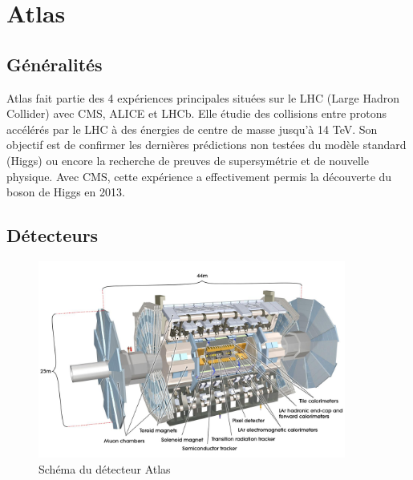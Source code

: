 \documentclass[11pt]{article} %
\begin{document}
%




\section{Atlas}

\subsection{Généralités}

Atlas fait partie des 4 expériences principales situées sur le LHC (Large Hadron Collider) avec CMS, ALICE et LHCb.
Elle étudie des collisions entre protons accélérés par le LHC à des énergies de centre de masse jusqu'à 14 TeV. Son objectif est de confirmer les dernières prédictions non testées du modèle standard (Higgs) ou encore la recherche de preuves de supersymétrie et de nouvelle physique. Avec CMS, cette expérience a effectivement permis la découverte du boson de Higgs en 2013.

\subsection{Détecteurs}

\begin{figure}[H]
\centering
  \caption{Schéma du détecteur Atlas}
\label{fig:atlas_detector}
 \includegraphics[width=0.9\textwidth]{../images/figures_AtlasDetectorLabelled.png}
\end{figure}
\end{document}
